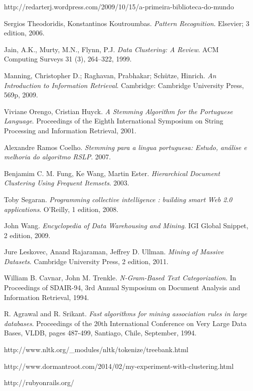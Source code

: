 \documentclass[a4paper,12pt]{article}
\begin{document}
\newpage

\begin{thebibliography}{9}

    http://redarterj.wordpress.com/2009/10/15/a-primeira-biblioteca-do-mundo

    Sergios Theodoridis, Konstantinos Koutroumbas.
    \emph{Pattern Recognition}.
    Elsevier; 3 edition,
    2006.
    
    Jain, A.K., Murty, M.N., Flynn, P.J.
    \emph{Data Clustering: A Review}.
    ACM Computing Surveys 31 (3), 264–322,
    1999.
    
    Manning, Christopher D.; Raghavan, Prabhakar; Schütze, Hinrich.
    \emph{An Introduction to Information Retrieval}.
    Cambridge: Cambridge University Press, 569p,
    2009.
    
    Viviane Orengo, Cristian Huyck.
    \emph{A Stemming Algorithm for the Portuguese Language}.
    Proceedings of the Eighth International Symposium on String Processing and Information Retrieval,
    2001.

    Alexandre Ramos Coelho.
    \emph{Stemming para a lingua portuguesa: Estudo, análise e melhoria do algoritmo RSLP}.
    2007.
    
    Benjamim C. M. Fung, Ke Wang, Martin Ester.
    \emph{Hierarchical Document Clustering Using Frequent Itemsets}.
    2003.
    
    Toby Segaran.
    \emph{Programming collective intelligence : building smart Web 2.0 applications}.
    O’Reilly, 1 edition,
    2008.
    
    John Wang.
    \emph{Encyclopedia of Data Warehousing and Mining}.
    IGI Global Snippet, 2 edition,
    2009.
    
    Jure Leskovec, Anand Rajaraman, Jeffrey D. Ullman.
    \emph{Mining of Massive Datasets}.
    Cambridge University Press, 2 edition,
    2011.
    
    William B. Cavnar, John M. Trenkle.
    \emph{N-Gram-Based Text Categorization}.
    In Proceedings of SDAIR-94, 3rd Annual Symposium on Document Analysis and Information Retrieval,
    1994.
    
    R. Agrawal and R. Srikant.
    \emph{Fast algorithms for mining association rules in large databases}.
    Proceedings of the 20th International Conference on Very Large Data Bases, VLDB, pages 487-499, Santiago, Chile,
    September, 1994.

    http://www.nltk.org/\_modules/nltk/tokenize/treebank.html

    http://www.dormantroot.com/2014/02/my-experiment-with-clustering.html

    http://rubyonrails.org/

\end{thebibliography}
\end{document}
